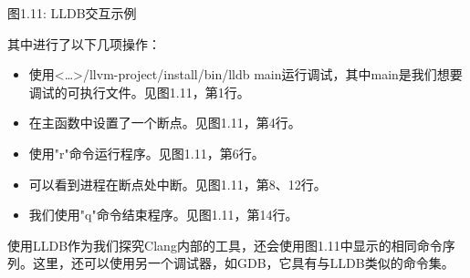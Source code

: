 \begin{center}
图1.11: LLDB交互示例
\end{center}

其中进行了以下几项操作：

\begin{itemize}
\item
使用<…>/llvm-project/install/bin/lldb main运行调试，其中main是我们想要调试的可执行文件。见图1.11，第1行。

\item
在主函数中设置了一个断点。见图1.11，第4行。

\item
使用"r"命令运行程序。见图1.11，第6行。

\item
可以看到进程在断点处中断。见图1.11，第8、12行。

\item
我们使用"q"命令结束程序。见图1.11，第14行。
\end{itemize}

使用LLDB作为我们探究Clang内部的工具，还会使用图1.11中显示的相同命令序列。这里，还可以使用另一个调试器，如GDB，它具有与LLDB类似的命令集。






